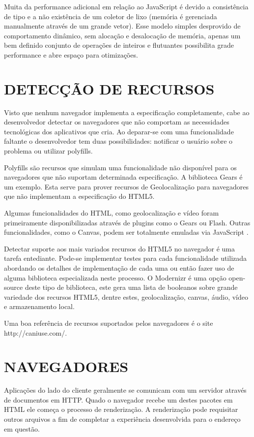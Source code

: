 \documentclass[
12pt,
a4paper,
portuges,
draft
]{report}
\begin{document}
Muita da performance adicional em relação ao JavaScript é devido
a consistência de tipo e a não existência de um coletor de lixo
(memória é gerenciada manualmente através de um grande vetor). Esse
modelo simples desprovido de comportamento dinâmico, sem alocação
e desalocação de memória, apenas um bem definido conjunto de
operações de inteiros e flutuantes possibilita grade performance e
abre espaço para otimizações.


\section{DETECÇÃO DE RECURSOS}

Visto que nenhum navegador implementa a especificação completamente,
cabe ao desenvolvedor detectar os navegadores que não comportam as
necessidades tecnológicas dos aplicativos que cria. Ao deparar-se com uma funcionalidade
faltante o desenvolvedor tem duas possibilidades: notificar o usuário sobre o
problema ou utilizar polyfills.

Polyfills são recursos que simulam uma funcionalidade não disponível para
os navegadores que não suportam determinada especificação. A biblioteca
Gears é um exemplo. Esta serve para prover recursos de Geolocalização para
navegadores que não implementam a especificação do HTML5.

Algumas funcionalidades do HTML, como geolocalização e vídeo foram primeiramente
disponibilizadas através de plugins como o Gears ou Flash. Outras funcionalidades, como o Canvas, podem ser totalmente emuladas via JavaScript \autocite{diveIntohtml}.

Detectar suporte aos mais variados recursos do HTML5 no navegador
é uma tarefa entediante. Pode-se implementar testes para
cada funcionalidade utilizada abordando os detalhes de implementação
de cada uma ou então fazer uso de alguma biblioteca especializada
neste processo. O Modernizr é uma opção open-source deste tipo de
biblioteca, este gera uma lista de booleanos sobre grande variedade dos
recursos HTML5, dentre estes, geolocalização, canvas, áudio, vídeo e
armazenamento local.

Uma boa referência de recursos suportados pelos navegadores é o site
http://caniuse.com/.

\section{NAVEGADORES}
Aplicações do lado do cliente geralmente se comunicam com um
servidor através de documentos em HTTP. Quado o navegador recebe um
destes pacotes em HTML ele começa o processo de renderização. A
renderização pode requisitar outros arquivos a fim de completar a
experiência desenvolvida para o endereço em questão.
\end{document}
